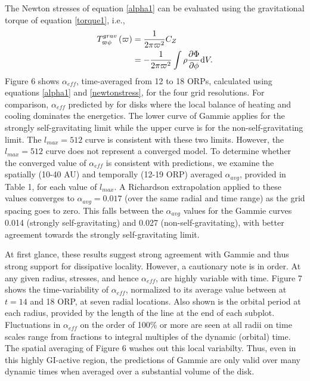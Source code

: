 \documentclass[manuscript]{aastex} %
\begin{document}
The Newton stresses of equation \ref{alpha1} can be evaluated using the gravitational torque of equation \ref{torque1}, i.e.,
\begin{equation}
\label{newtonstress}
\begin{split}
 T_{\varpi\phi}^{grav}\left( \varpi \right) & = \frac{1}{2\pi\varpi^2}C_Z\\
                                & = - \frac{1}{2\pi\varpi^2} \int \rho\frac{\partial\Phi}{\partial\phi} {\rm d}V.
\end{split}
\end{equation}
Figure 6 shows $\alpha_{eff}$, time-averaged from 12 to 18 ORPs, calculated using equations \ref{alpha1} and \ref{newtonstress},
for the four grid resolutions.  For comparison, 
$\alpha_{eff}$ predicted by \citet{gammie2001} for disks where the local balance of heating and cooling dominates the energetics.  The lower curve of Gammie applies for the strongly self-gravitating limit while the upper curve 
is for the non-self-gravitating limit.   The $l_{max} = 512$ curve is consistent with these two limits.  However, 
the  $l_{max} = 512$ curve does not represent a converged model.
To determine whether the converged value of $\alpha_{eff}$ is consistent with predictions, we examine 
the spatially (10-40 AU) and temporally (12-19 ORP) averaged  $\alpha_{avg}$,
provided in Table 1, for each value of  $l_{max}$.    A Richardson extrapolation applied to these values  
converges to $\alpha_{avg} = 0.017$ (over the same radial  and time range)
as the grid spacing goes to zero.   This falls
between the $\alpha_{avg}$ values for the Gammie curves 0.014 (strongly self-gravitating) and 0.027 (non-self-gravitating),
with better agreement towards the strongly self-gravitating limit.

At first glance, these results suggest strong agreement with Gammie and thus strong support for dissipative
locality.  However, a cautionary note is in order.  At any given radius, 
stresses, and hence $\alpha_{eff}$, are highly variable with time.
Figure 7 shows the time-variability of $\alpha_{eff}$, 
normalized to its average value between at $t = 14$ and 18 ORP, at seven radial locations.   
Also shown is the orbital period at each radius, provided by the length of the line at the end of each subplot. 
Fluctuations in $\alpha_{eff}$
on the order of 100\% or more are seen at all radii
on  time scales range from fractions to integral multiples of the dynamic (orbital) time.  The spatial averaging
of Figure 6 washes out this local variabilty.
Thus,
even in this highly GI-active region, the predictions of Gammie are only valid over many dynamic times 
when averaged over a substantial volume of the disk.
\end{document}
